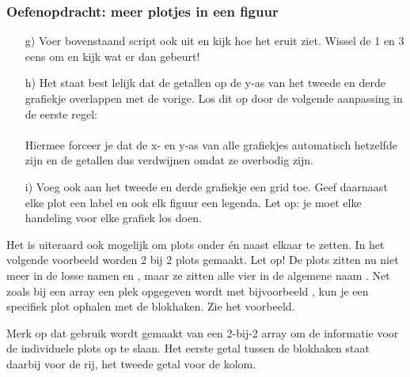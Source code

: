\documentclass[a4paper,11pt, fleqn]{article}
\begin{document}
\subsubsection*{Oefenopdracht: meer plotjes in een figuur}
\begin{itemize}
	\item[g)] Voer bovenstaand script ook uit en kijk hoe het eruit ziet. Wissel de 1 en 3 eens om en kijk wat er dan gebeurt!
	\item[h)] Het staat best lelijk dat de getallen op de y-as van het tweede en derde grafiekje overlappen met de vorige. Los dit op door de volgende aanpassing in de eerste regel:\\
	\\
	Hiermee forceer je dat de x- en y-as van alle grafiekjes automatisch hetzelfde zijn en de getallen dus verdwijnen omdat ze overbodig zijn.
	\item[i)] Voeg ook aan het tweede en derde grafiekje een grid toe. Geef daarnaast elke plot een label en ook elk figuur een legenda. Let op: je moet elke handeling voor elke grafiek los doen.
\end{itemize}

Het is uiteraard ook mogelijk om plots onder \'en naast elkaar te zetten. In het volgende voorbeeld worden 2 bij 2 plots gemaakt. Let op! De plots zitten nu niet meer in de losse namen  en , maar ze zitten alle vier in de algemene naam . Net zoals bij een array een plek opgegeven wordt met bijvoorbeeld \pythoninline{[1]}, kun je een specifiek plot ophalen met de blokhaken. Zie het voorbeeld.


Merk op dat gebruik wordt gemaakt van een 2-bij-2 array om de informatie voor de individuele plots op te slaan. Het eerste getal tussen de blokhaken staat daarbij voor de rij, het tweede getal voor de kolom.
\end{document}
